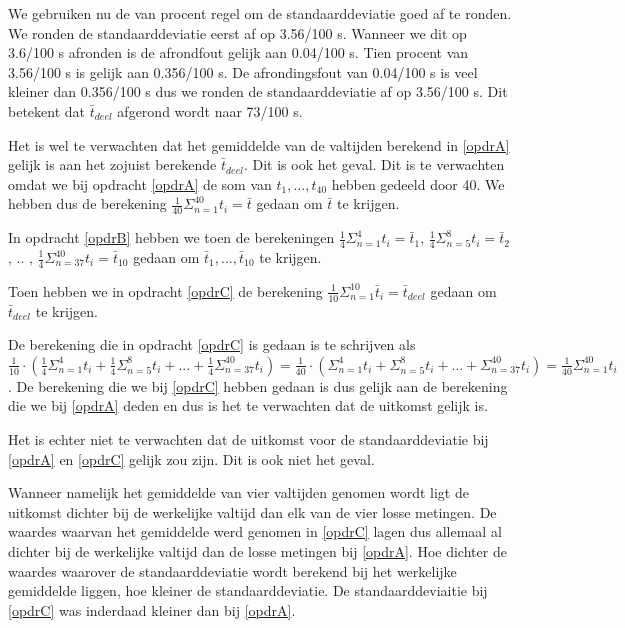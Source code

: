 \documentclass[12pt, dutch, a4paper]{article}
\theoremstyle{definition}
\begin{document}
\begin{enumerate}[(a.)]
We gebruiken nu de van procent regel om de standaarddeviatie goed af te ronden. We ronden de standaarddeviatie eerst af op 3.56/100 s. Wanneer we dit op 3.6/100 s afronden is de afrondfout gelijk aan 0.04/100 s. Tien procent van 3.56/100 s is gelijk aan 0.356/100 s. De afrondingsfout van 0.04/100 s is veel kleiner dan 0.356/100 s dus we ronden de standaarddeviatie af op 3.56/100 s. Dit betekent dat $\bar t_{deel}$ afgerond wordt naar 73/100 s. 

Het is wel te verwachten dat het gemiddelde van de valtijden berekend in \ref{opdrA} gelijk is aan het zojuist berekende $\bar t_{deel}$. Dit is ook het geval. Dit is te verwachten omdat we bij opdracht \ref{opdrA} de som van $t_1, ..., t_{40}$ hebben gedeeld door 40. We hebben dus de berekening $\frac{1}{40}\Sigma_{n=1}^{40} t_i = \bar t$ gedaan om $\bar t$ te krijgen. 

In opdracht \ref{opdrB} hebben we toen de berekeningen $\frac{1}{4}\Sigma_{n=1}^{4} t_i = \bar t_1$, $\frac{1}{4}\Sigma_{n=5}^{8} t_i = \bar t_2$, .. , $\frac{1}{4}\Sigma_{n=37}^{40} t_i = \bar t_{10}$ gedaan om $\bar t_1, ..., \bar t_{10}$ te krijgen. 

Toen hebben we in opdracht \ref{opdrC} de berekening $\frac{1}{10}\Sigma_{n=1}^{10} \bar t_i = \bar t_{deel}$ gedaan om $\bar t_{deel}$ te krijgen. 

De berekening die in opdracht \ref{opdrC} is gedaan is te schrijven als $\frac{1}{10} \cdot (\frac{1}{4}\Sigma_{n=1}^{4} t_i + \frac{1}{4}\Sigma_{n=5}^{8} t_i + ... + \frac{1}{4}\Sigma_{n=37}^{40} t_i) = \frac{1}{40} \cdot (\Sigma_{n=1}^{4} t_i + \Sigma_{n=5}^{8} t_i + ... + \Sigma_{n=37}^{40} t_i) =  \frac{1}{40} \Sigma_{n=1}^{40} t_i$. De berekening die we bij \ref{opdrC} hebben gedaan is dus gelijk aan de berekening die we bij \ref{opdrA} deden en dus is het te verwachten dat de uitkomst gelijk is.

Het is echter niet te verwachten dat de uitkomst voor de standaarddeviatie bij \ref{opdrA} en \ref{opdrC} gelijk zou zijn. Dit is ook niet het geval. 

Wanneer namelijk het gemiddelde van vier valtijden genomen wordt ligt de uitkomst dichter bij de werkelijke valtijd dan elk van de vier losse metingen. De waardes waarvan het gemiddelde werd genomen in \ref{opdrC} lagen dus allemaal al dichter bij de werkelijke valtijd dan de losse metingen bij \ref{opdrA}. Hoe dichter de waardes waarover de standaarddeviatie wordt berekend bij het werkelijke gemiddelde liggen, hoe kleiner de standaarddeviatie. De standaarddeviaitie bij \ref{opdrC} was inderdaad kleiner dan bij \ref{opdrA}.


\end{enumerate}
\end{document}
